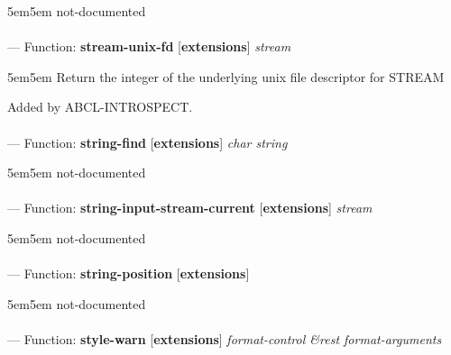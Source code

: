 \begin{adjustwidth}{5em}{5em}
not-documented
\end{adjustwidth}

\paragraph{}
\label{EXTENSIONS:STREAM-UNIX-FD}
--- Function: \textbf{stream-unix-fd} [\textbf{extensions}] \textit{stream}

\begin{adjustwidth}{5em}{5em}
Return the integer of the underlying unix file descriptor for STREAM

Added by ABCL-INTROSPECT.
\end{adjustwidth}

\paragraph{}
\label{EXTENSIONS:STRING-FIND}
--- Function: \textbf{string-find} [\textbf{extensions}] \textit{char string}

\begin{adjustwidth}{5em}{5em}
not-documented
\end{adjustwidth}

\paragraph{}
\label{EXTENSIONS:STRING-INPUT-STREAM-CURRENT}
--- Function: \textbf{string-input-stream-current} [\textbf{extensions}] \textit{stream}

\begin{adjustwidth}{5em}{5em}
not-documented
\end{adjustwidth}

\paragraph{}
\label{EXTENSIONS:STRING-POSITION}
--- Function: \textbf{string-position} [\textbf{extensions}] \textit{}

\begin{adjustwidth}{5em}{5em}
not-documented
\end{adjustwidth}

\paragraph{}
\label{EXTENSIONS:STYLE-WARN}
--- Function: \textbf{style-warn} [\textbf{extensions}] \textit{format-control \&rest format-arguments}


